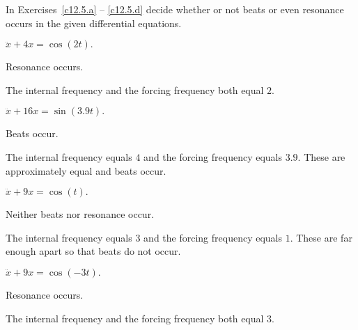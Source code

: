 \documentclass{ximera}
\begin{document}
\noindent In Exercises~\ref{c12.5.a} -- \ref{c12.5.d} decide whether or not
beats or even resonance occurs in the given differential equations.
\begin{exercise} \label{c12.5.a}
$\ddot{x} + 4x = \cos(2t).$

\begin{solution}
\ans Resonance occurs.

\soln  The internal frequency and the forcing frequency both equal $2$.


\end{solution}
\end{exercise}
\begin{exercise} \label{c12.5.b}
$\ddot{x} + 16x = \sin(3.9 t).$

\begin{solution}
\ans Beats occur.

\soln  The internal frequency equals $4$ and the forcing frequency equals
$3.9$.  These are approximately equal and beats occur.

\end{solution}
\end{exercise}
\begin{exercise} \label{c12.5.c}
$\ddot{x} + 9x = \cos(t).$

\begin{solution}
\ans Neither beats nor resonance occur.

The internal frequency equals $3$ and the forcing frequency equals
$1$. These are far enough apart so that beats do not occur.

\end{solution}
\end{exercise}
\begin{exercise} \label{c12.5.d}
$\ddot{x} + 9x = \cos(-3t).$

\begin{solution}
\ans Resonance occurs.

\soln  The internal frequency and the forcing frequency both equal $3$.


\end{solution}
\end{exercise}
\end{document}
